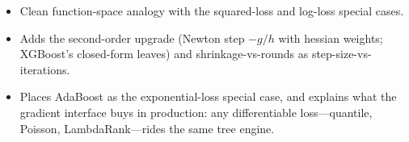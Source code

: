 \begin{interviewq}
\goodgreat
\begin{itemize}
    \item {} Clean function-space analogy with the squared-loss and log-loss special cases.
    \item {} Adds the second-order upgrade (Newton step $-g/h$ with hessian weights; XGBoost's closed-form leaves) and shrinkage-vs-rounds as step-size-vs-iterations.
    \item {} Places AdaBoost as the exponential-loss special case, and explains what the gradient interface buys in production: any differentiable loss---quantile, Poisson, LambdaRank---rides the same tree engine.
\end{itemize}

\end{interviewq}

